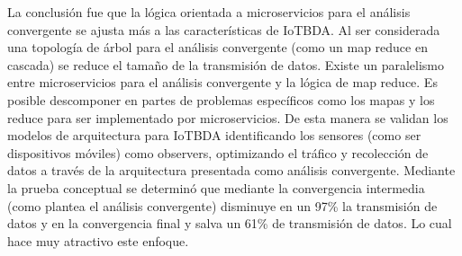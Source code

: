 La conclusión fue que la lógica orientada a microservicios para el análisis convergente se ajusta más a las características de IoTBDA. Al ser considerada una topología de árbol para el análisis convergente (como un map reduce en cascada) se reduce el tamaño de la transmisión de datos.
Existe un paralelismo entre microservicios para el análisis convergente y la lógica de map reduce. Es posible descomponer en partes de problemas específicos como los mapas y los reduce para ser implementado por microservicios.
De esta manera se validan los modelos de arquitectura para IoTBDA identificando los sensores (como ser dispositivos móviles) como observers, optimizando el tráfico y recolección de datos a través de la arquitectura presentada como análisis convergente.
Mediante la prueba conceptual se determinó que mediante la convergencia intermedia (como plantea el análisis convergente)  disminuye en un 97\% la transmisión de datos y en la convergencia final y salva un 61\% de transmisión de datos. Lo cual hace muy atractivo este enfoque.\par









